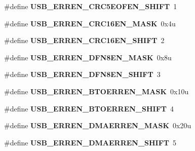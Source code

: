 \begin{DoxyCompactItemize}
\#define {\bfseries U\+S\+B\+\_\+\+E\+R\+R\+E\+N\+\_\+\+C\+R\+C5\+E\+O\+F\+E\+N\+\_\+\+S\+H\+I\+FT}~1
\item 
\mbox{\label{group___u_s_b___register___masks_gae216c42729f6b3d992001136744fe341}} 
\#define {\bfseries U\+S\+B\+\_\+\+E\+R\+R\+E\+N\+\_\+\+C\+R\+C16\+E\+N\+\_\+\+M\+A\+SK}~0x4u
\item 
\mbox{\label{group___u_s_b___register___masks_ga7d910c7016807387969de45f0ac3e2d6}} 
\#define {\bfseries U\+S\+B\+\_\+\+E\+R\+R\+E\+N\+\_\+\+C\+R\+C16\+E\+N\+\_\+\+S\+H\+I\+FT}~2
\item 
\mbox{\label{group___u_s_b___register___masks_ga4077d6e25312cdf05ef982907720c2f6}} 
\#define {\bfseries U\+S\+B\+\_\+\+E\+R\+R\+E\+N\+\_\+\+D\+F\+N8\+E\+N\+\_\+\+M\+A\+SK}~0x8u
\item 
\mbox{\label{group___u_s_b___register___masks_ga25ff64c64f5871c1c278c5639d862ba7}} 
\#define {\bfseries U\+S\+B\+\_\+\+E\+R\+R\+E\+N\+\_\+\+D\+F\+N8\+E\+N\+\_\+\+S\+H\+I\+FT}~3
\item 
\mbox{\label{group___u_s_b___register___masks_ga3e02cf7d8b6fce5077848051a320c609}} 
\#define {\bfseries U\+S\+B\+\_\+\+E\+R\+R\+E\+N\+\_\+\+B\+T\+O\+E\+R\+R\+E\+N\+\_\+\+M\+A\+SK}~0x10u
\item 
\mbox{\label{group___u_s_b___register___masks_ga6df540868c71ce6e3c7b8737a048c2aa}} 
\#define {\bfseries U\+S\+B\+\_\+\+E\+R\+R\+E\+N\+\_\+\+B\+T\+O\+E\+R\+R\+E\+N\+\_\+\+S\+H\+I\+FT}~4
\item 
\mbox{\label{group___u_s_b___register___masks_gae1e237556956a0eb5e669aadded213b8}} 
\#define {\bfseries U\+S\+B\+\_\+\+E\+R\+R\+E\+N\+\_\+\+D\+M\+A\+E\+R\+R\+E\+N\+\_\+\+M\+A\+SK}~0x20u
\item 
\mbox{\label{group___u_s_b___register___masks_ga8b75afb2fa004a75b39023e38db4e784}} 
\#define {\bfseries U\+S\+B\+\_\+\+E\+R\+R\+E\+N\+\_\+\+D\+M\+A\+E\+R\+R\+E\+N\+\_\+\+S\+H\+I\+FT}~5
\item 

\end{DoxyCompactItemize}
